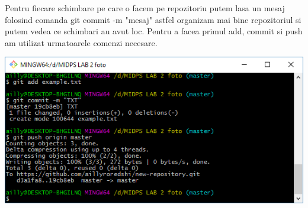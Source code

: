 Pentru fiecare schimbare pe care o facem pe repozitoriu putem lasa un mesaj folosind comanda git commit -m "mesaj" astfel organizam mai bine repozitoriul si putem vedea  ce schimbari au avut loc. Pentru a facea primul add, commit si push am utilizat urmatoarele comenzi necesare.\\
\begin{center}
\includegraphics[scale=0.75]{images/4}\\
\end{center}

